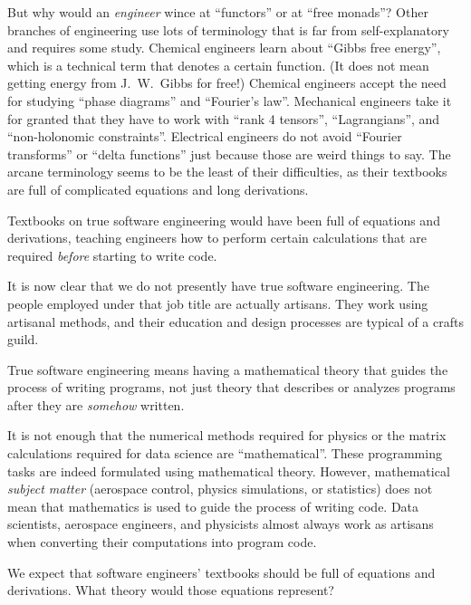 But why would an \emph{engineer} wince at \textsf{``}functors\textsf{''} or at \textsf{``}free
monads\textsf{''}? Other branches of engineering use lots of terminology that
is far from self-explanatory and requires some study. Chemical engineers
learn about \textsf{``}Gibbs free energy\textsf{''}, which is a technical term that
denotes a certain function. (It does not mean getting
energy from J.~W.~Gibbs for free!)
Chemical engineers accept the need for studying \textsf{``}phase diagrams\textsf{''}
and \textsf{``}Fourier\textsf{'}s law\textsf{''}. Mechanical engineers take it for granted
that they have to work with \textsf{``}rank 4 tensors\textsf{''}, \textsf{``}Lagrangians\textsf{''},
and \textsf{``}non-holonomic constraints\textsf{''}. Electrical engineers do not avoid
\textsf{``}Fourier transforms\textsf{''} or \textsf{``}delta functions\textsf{''} just because those
are weird things to say. The arcane terminology seems to be the least
of their difficulties, as their textbooks are full of complicated
equations and long derivations.

Textbooks on true software engineering would have been full of equations
and derivations, teaching engineers how to perform certain calculations
that are required \emph{before} starting to write code.


It is now clear that we do not presently have true software engineering.
The people employed under that job title are actually artisans. They
work using artisanal methods, and their education and design processes
are typical of a crafts guild.

True software engineering means having a mathematical theory that
guides the process of writing programs, \textemdash{} not just theory
that describes or analyzes programs after they are \emph{somehow}
written.

It is not enough that the numerical methods required for physics or
the matrix calculations required for data science are \textsf{``}mathematical\textsf{''}.
These programming tasks are indeed formulated using mathematical theory.
However, mathematical \emph{subject matter} (aerospace control, physics
simulations, or statistics) does not mean that mathematics is used
to guide the process of writing code. Data scientists, aerospace engineers,
and physicists almost always work as artisans when converting their
computations into program code.

We expect that software engineers\textsf{'} textbooks should be full
of equations and derivations. What theory would those equations represent?

